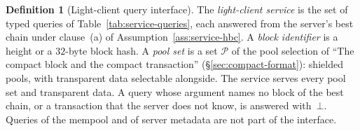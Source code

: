 \documentclass[11pt,a4paper]{article}
\theoremstyle{definition}
\newtheorem{definition}[theorem]{Definition}
\begin{document}
\begin{definition}[Light-client query interface]\label{def:service-queries}
The \emph{light-client service} is the set of typed queries of
Table~\ref{tab:service-queries}, each answered from the server's best chain
under clause~(a) of Assumption~\ref{ass:service-hbc}. A \emph{block
identifier} is a height or a $32$-byte block hash. A \emph{pool set} is a
set $\mathcal{P}$ of the pool selection of ``The compact block and the
compact transaction'' (\S\ref{sec:compact-format}): shielded pools, with
transparent data selectable alongside. The service serves every pool set
and transparent data. A query whose argument names no block of the best
chain, or a transaction that the server does not know, is answered
with~$\bot$. Queries of the mempool and of server metadata are not part of
the interface.
\end{definition}
\end{document}
